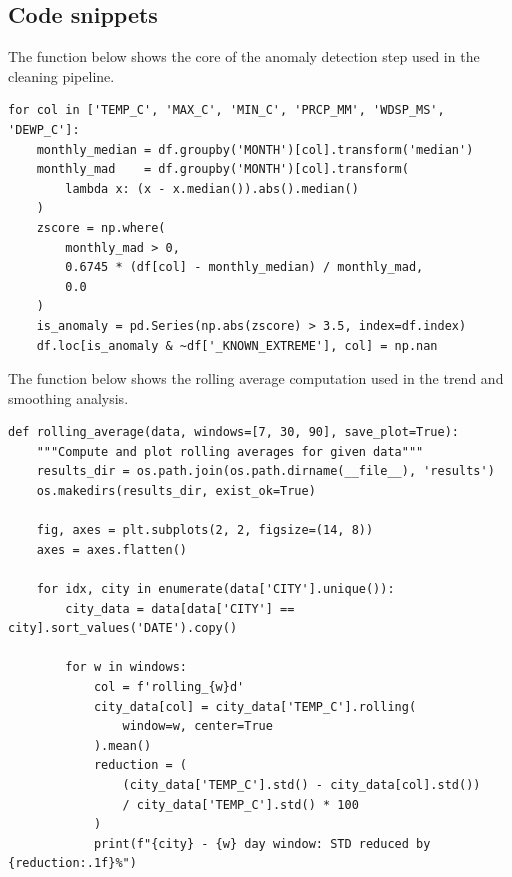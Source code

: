 \subsection{Code snippets}

The function below shows the core of the anomaly detection step used
in the cleaning pipeline.

\begin{verbatim}
for col in ['TEMP_C', 'MAX_C', 'MIN_C', 'PRCP_MM', 'WDSP_MS', 'DEWP_C']:
    monthly_median = df.groupby('MONTH')[col].transform('median')
    monthly_mad    = df.groupby('MONTH')[col].transform(
        lambda x: (x - x.median()).abs().median()
    )
    zscore = np.where(
        monthly_mad > 0,
        0.6745 * (df[col] - monthly_median) / monthly_mad,
        0.0
    )
    is_anomaly = pd.Series(np.abs(zscore) > 3.5, index=df.index)
    df.loc[is_anomaly & ~df['_KNOWN_EXTREME'], col] = np.nan
\end{verbatim}
The function below shows the rolling average computation used
in the trend and smoothing analysis.

\begin{verbatim}
def rolling_average(data, windows=[7, 30, 90], save_plot=True):
    """Compute and plot rolling averages for given data"""
    results_dir = os.path.join(os.path.dirname(__file__), 'results')
    os.makedirs(results_dir, exist_ok=True)

    fig, axes = plt.subplots(2, 2, figsize=(14, 8))
    axes = axes.flatten()

    for idx, city in enumerate(data['CITY'].unique()):
        city_data = data[data['CITY'] == city].sort_values('DATE').copy()

        for w in windows:
            col = f'rolling_{w}d'
            city_data[col] = city_data['TEMP_C'].rolling(
                window=w, center=True
            ).mean()
            reduction = (
                (city_data['TEMP_C'].std() - city_data[col].std())
                / city_data['TEMP_C'].std() * 100
            )
            print(f"{city} - {w} day window: STD reduced by {reduction:.1f}%")
\end{verbatim}


